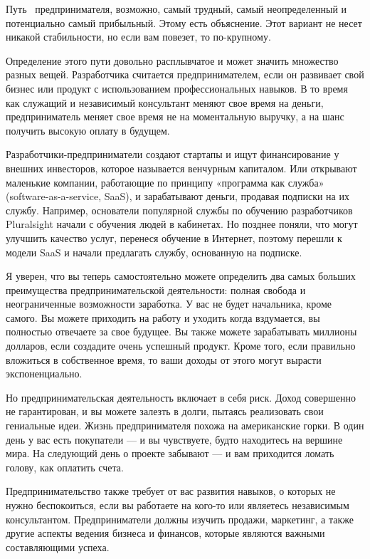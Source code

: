 \documentclass{../industrial-development}
\begin{document}
\lecturenotes

Путь~\cite[с.~62--67]{Sonmez} предпринимателя, возможно, самый трудный, самый неопределенный и потенциально самый прибыльный. Этому есть объяснение. Этот вариант не несет никакой стабильности, но если вам повезет, то по-крупному.

Определение этого пути довольно расплывчатое и может значить множество разных вещей. Разработчика считается предпринимателем, если он развивает свой бизнес или продукт с использованием профессиональных навыков. В то время как служащий и независимый консультант меняют свое время на деньги, предприниматель меняет свое время не на моментальную выручку, а на шанс получить высокую оплату в будущем.

Разработчики-предприниматели создают стартапы и ищут финансирование у внешних инвесторов, которое называется венчурным капиталом. Или открывают маленькие компании, работающие по принципу «программа как служба» (software-as-a-service, SaaS), и зарабатывают деньги, продавая подписки на их службу. Например, основатели популярной службы по обучению разработчиков Pluralsight начали с обучения людей в кабинетах. Но позднее поняли, что могут улучшить качество услуг, перенеся обучение в Интернет, поэтому перешли к модели SaaS и начали предлагать службу, основанную на подписке.

Я уверен, что вы теперь самостоятельно можете определить два самых больших преимущества предпринимательской деятельности: полная свобода и неограниченные возможности заработка. У вас не будет начальника, кроме самого. Вы можете приходить на работу и уходить когда вздумается, вы полностью отвечаете за свое будущее. Вы также можете зарабатывать миллионы долларов, если создадите очень успешный продукт. Кроме того, если правильно вложиться в собственное время, то ваши доходы от этого могут вырасти экспоненциально.

Но предпринимательская деятельность включает в себя риск. Доход совершенно не гарантирован, и вы можете залезть в долги, пытаясь реализовать свои гениальные идеи. Жизнь предпринимателя похожа на американские горки. В один день у вас есть покупатели — и вы чувствуете, будто находитесь на вершине мира. На следующий день о проекте забывают — и вам приходится ломать голову, как оплатить счета.

Предпринимательство также требует от вас развития навыков, о которых не нужно беспокоиться, если вы работаете на кого-то или являетесь независимым консультантом. Предприниматели должны изучить продажи, маркетинг, а также другие аспекты ведения бизнеса и финансов, которые являются важными составляющими успеха. 
\end{document}
